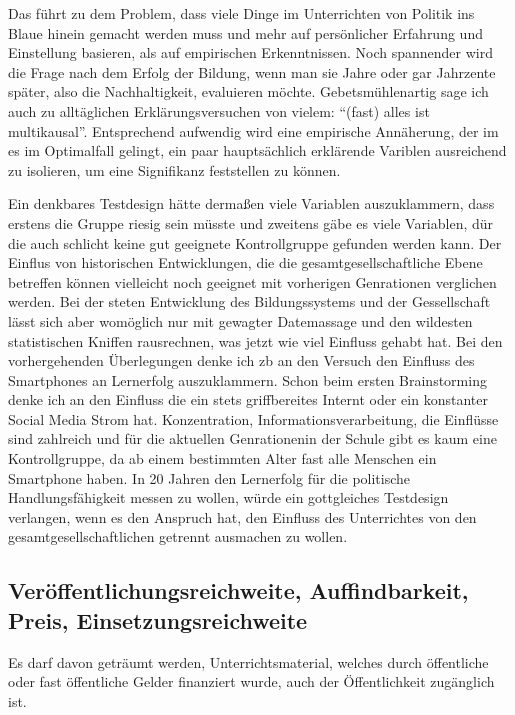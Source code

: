 Das führt zu dem Problem, dass viele Dinge im Unterrichten von Politik ins Blaue hinein gemacht werden muss und mehr auf persönlicher Erfahrung und Einstellung basieren, als auf empirischen Erkenntnissen.
Noch spannender wird die Frage nach dem Erfolg der Bildung, wenn man sie Jahre oder gar Jahrzente später, also die Nachhaltigkeit, evaluieren möchte. Gebetsmühlenartig sage ich auch zu alltäglichen Erklärungsversuchen von vielem: \enquote{(fast) alles ist multikausal}. Entsprechend aufwendig wird eine empirische Annäherung, der im es im Optimalfall gelingt, ein paar hauptsächlich erklärende Variblen ausreichend zu isolieren, um eine Signifikanz feststellen zu können. 


Ein denkbares Testdesign hätte dermaßen viele Variablen auszuklammern, dass erstens die Gruppe riesig sein müsste und zweitens gäbe es viele Variablen, dür die auch schlicht keine gut geeignete Kontrollgruppe gefunden werden kann. Der Einflus von historischen Entwicklungen, die die gesamtgesellschaftliche Ebene betreffen können vielleicht noch geeignet mit vorherigen Genrationen verglichen werden. Bei der steten Entwicklung des Bildungssystems und der Gessellschaft lässt sich aber womöglich nur mit gewagter Datemassage und den wildesten statistischen Kniffen rausrechnen, was jetzt wie viel Einfluss gehabt hat. 
Bei den vorhergehenden Überlegungen denke ich \gls{zb} an den Versuch den Einfluss des Smartphones an Lernerfolg auszuklammern. Schon beim ersten Brainstorming denke ich an den Einfluss die ein stets griffbereites Internt oder ein konstanter Social Media Strom hat. Konzentration, Informationsverarbeitung, die Einflüsse sind zahlreich und für die aktuellen Genrationenin der Schule gibt es kaum eine Kontrollgruppe, da ab einem bestimmten Alter fast alle Menschen ein Smartphone haben. In 20 Jahren den Lernerfolg für die politische Handlungsfähigkeit messen zu wollen, würde ein gottgleiches Testdesign verlangen, wenn es den Anspruch hat, den Einfluss des Unterrichtes von den gesamtgesellschaftlichen getrennt ausmachen zu wollen. 



\subsection{Veröffentlichungsreichweite, Auffindbarkeit, Preis, Einsetzungsreichweite \label{öffi}}

Es darf davon geträumt werden, Unterrichtsmaterial, welches durch öffentliche oder fast öffentliche Gelder finanziert wurde, auch der Öffentlichkeit zugänglich ist.



